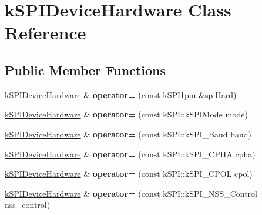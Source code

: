 \hypertarget{classkSPIDeviceHardware}{}\section{k\+S\+P\+I\+Device\+Hardware Class Reference}
\label{classkSPIDeviceHardware}
\subsection*{Public Member Functions}
\begin{DoxyCompactItemize}
\item 
\hyperlink{classkSPIDeviceHardware}{k\+S\+P\+I\+Device\+Hardware} \& {\bfseries operator=} (const \hyperlink{structkSPI1pin}{k\+S\+P\+I1pin} \&spi\+Hard)\hypertarget{classkSPIDeviceHardware_a169e7e9d2a6d4ae7a220c9026959cc9c}{}\label{classkSPIDeviceHardware_a169e7e9d2a6d4ae7a220c9026959cc9c}

\item 
\hyperlink{classkSPIDeviceHardware}{k\+S\+P\+I\+Device\+Hardware} \& {\bfseries operator=} (const k\+S\+P\+I\+::k\+S\+P\+I\+Mode mode)\hypertarget{classkSPIDeviceHardware_a5ba117f50e6dae7f5d91f0d2624d588c}{}\label{classkSPIDeviceHardware_a5ba117f50e6dae7f5d91f0d2624d588c}

\item 
\hyperlink{classkSPIDeviceHardware}{k\+S\+P\+I\+Device\+Hardware} \& {\bfseries operator=} (const k\+S\+P\+I\+::k\+S\+P\+I\+\_\+\+Baud baud)\hypertarget{classkSPIDeviceHardware_a3167c104f7eb427144de555ffe700d90}{}\label{classkSPIDeviceHardware_a3167c104f7eb427144de555ffe700d90}

\item 
\hyperlink{classkSPIDeviceHardware}{k\+S\+P\+I\+Device\+Hardware} \& {\bfseries operator=} (const k\+S\+P\+I\+::k\+S\+P\+I\+\_\+\+C\+P\+HA cpha)\hypertarget{classkSPIDeviceHardware_a0c39789100f567dd509cba4fa7573363}{}\label{classkSPIDeviceHardware_a0c39789100f567dd509cba4fa7573363}

\item 
\hyperlink{classkSPIDeviceHardware}{k\+S\+P\+I\+Device\+Hardware} \& {\bfseries operator=} (const k\+S\+P\+I\+::k\+S\+P\+I\+\_\+\+C\+P\+OL cpol)\hypertarget{classkSPIDeviceHardware_a4cd32775d02a9677089744187cb00e63}{}\label{classkSPIDeviceHardware_a4cd32775d02a9677089744187cb00e63}

\item 
\hyperlink{classkSPIDeviceHardware}{k\+S\+P\+I\+Device\+Hardware} \& {\bfseries operator=} (const k\+S\+P\+I\+::k\+S\+P\+I\+\_\+\+N\+S\+S\+\_\+\+Control nss\+\_\+control)\hypertarget{classkSPIDeviceHardware_a252c8ca08d3472103ee9cd2d74b48894}{}\label{classkSPIDeviceHardware_a252c8ca08d3472103ee9cd2d74b48894}


\end{DoxyCompactItemize}
